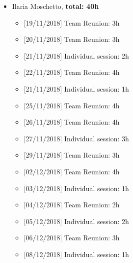 \begin{itemize}
\item Ilaria Moschetto, \textbf{total: 40h}  
\begin{itemize}
    \item {[}19/11/2018{]} Team Reunion: 3h
    \item {[}20/11/2018{]} Team Reunion: 3h
    \item {[}21/11/2018{]} Individual session: 2h
    \item {[}22/11/2018{]} Team Reunion: 4h
    \item {[}21/11/2018{]} Individual session: 1h
    \item {[}25/11/2018{]} Team Reunion: 4h
    \item {[}26/11/2018{]} Team Reunion: 4h
    \item {[}27/11/2018{]} Individual session: 3h
    \item {[}29/11/2018{]} Team Reunion: 3h
    \item {[}02/12/2018{]} Team Reunion: 4h
    \item {[}03/12/2018{]} Individual session: 1h
    \item {[}04/12/2018{]} Team Reunion: 2h
    \item {[}05/12/2018{]} Individual session: 2h
    \item {[}06/12/2018{]} Team Reunion: 3h
    \item {[}08/12/2018{]} Individual session: 1h
\end{itemize}

\end{itemize}